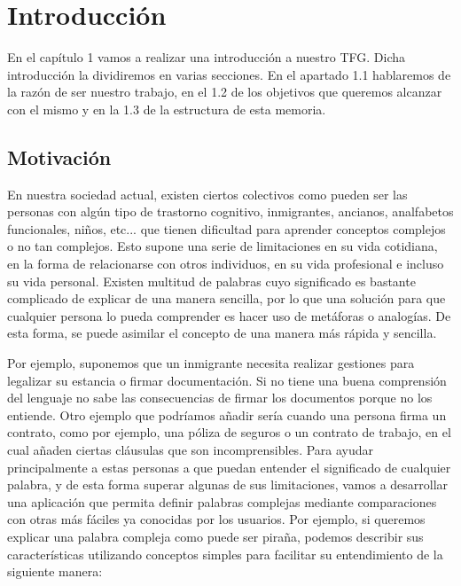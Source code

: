 \chapter{Introducción}
\label{cap:introduccion}




	En el capítulo 1 vamos a realizar una introducción a nuestro TFG. Dicha introducción la dividiremos en varias secciones. En el apartado 1.1 hablaremos de la razón de ser nuestro trabajo, en el 1.2 de los objetivos que queremos alcanzar con el mismo y en la 1.3 de la estructura de esta memoria.



\section{Motivación}
\label{cap:sec:motivacion}
En nuestra sociedad actual, existen ciertos colectivos como pueden ser las personas con algún tipo de trastorno cognitivo, inmigrantes, ancianos, analfabetos funcionales, niños, etc... que tienen dificultad para aprender conceptos complejos o no tan complejos. Esto supone una serie de limitaciones en su vida cotidiana, en la forma de relacionarse con otros individuos, en su vida profesional e incluso su vida personal.\newline
Existen multitud de palabras cuyo significado es bastante complicado de explicar de una manera sencilla, por lo que una solución para que cualquier persona lo pueda comprender es hacer uso de metáforas o analogías. De esta forma, se puede asimilar el concepto de una manera más rápida y sencilla. 

Por ejemplo, suponemos que un inmigrante necesita realizar gestiones para legalizar su estancia o firmar documentación. Si no tiene una buena comprensión del lenguaje no sabe las consecuencias de firmar los documentos porque no los entiende. 
Otro ejemplo que podríamos añadir sería cuando una persona firma un contrato, como por ejemplo, una póliza de seguros o un contrato de trabajo, en el cual añaden ciertas cláusulas que son incomprensibles. 
\newline
Para ayudar principalmente a estas personas a que puedan entender el significado de cualquier palabra, y de esta forma superar algunas de sus limitaciones, vamos a desarrollar una aplicación que permita definir palabras complejas mediante comparaciones con otras más fáciles ya conocidas por los usuarios. Por ejemplo, si queremos explicar una palabra compleja como puede ser piraña, podemos describir sus características utilizando conceptos simples para facilitar su entendimiento de la siguiente manera: \newline

